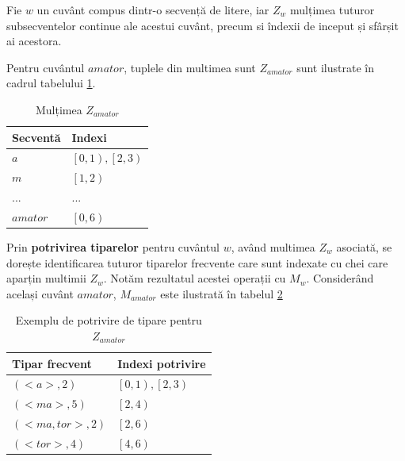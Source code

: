 Fie $w$ un cuvânt compus dintr-o secvență de litere, iar $Z_w$ mulțimea tuturor subsecventelor continue ale acestui cuvânt, precum si îndexii de inceput și sfârșit ai acestora.

\begin{ex}
Pentru cuvântul $amator$, tuplele din multimea sunt $Z_{amator}$ sunt ilustrate în cadrul tabelului \ref{table:sdb_substrings}. 
\end{ex}


\begin{table}[h!]
\centering    
\begin{tabular}{|l|l|}    
\hline      
Secventă & Indexi\\
\hline
$a$ 		& $\left[0,1\right), \left[2,3\right)$  \\
$m$ 		& $\left[1,2\right)$  \\
... 		& ...  \\
$amator$ 	& $\left[0,6\right)$  \\

\hline
\end{tabular}
\caption{Mulțimea $Z_{amator}$}
\label{table:sdb_substrings}               
\end{table}  

\begin{defi} Prin \textbf{potrivirea tiparelor} pentru cuvântul $w$, având multimea $Z_w$ asociată, se dorește identificarea tuturor tiparelor frecvente care sunt indexate cu chei care aparțin multimii $Z_w$. Notăm rezultatul acestei operații cu $M_w$. Considerând același cuvânt $amator$, $M_{amator}$ este ilustrată în tabelul \ref{table:sdb_pattern_match}
\end{defi}

\begin{table}[h!]
\centering    
\begin{tabular}{|l|l|}    
\hline      
Tipar frecvent & Indexi potrivire\\
\hline
$(<a>, 2)$			& $\left[0,1\right), \left[2,3\right)$   \\
$(<ma>, 5)$  		& $\left[2,4\right)$\\
$(<ma, tor>, 2)$ 	& $\left[2,6\right)$ \\
$(<tor>, 4)$  		& $\left[4,6\right)$\\
\hline
\end{tabular}
\caption{Exemplu de potrivire de tipare pentru $Z_{amator}$}
\label{table:sdb_pattern_match}               
\end{table}  

